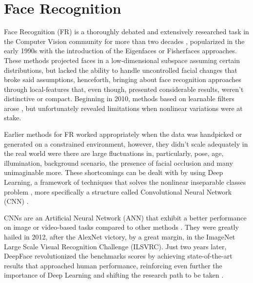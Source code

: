 \documentclass[class=report, crop=false, a4paper, 12pt]{standalone}
\begin{document}
\newpage

\section{Face Recognition}
Face Recognition (FR) is a thoroughly debated and extensively researched task in the Computer Vision community for more than two decades \autocite{ranjanDeepLearningUnderstanding2018}, popularized in the early 1990s with the introduction of the Eigenfaces \autocite{turkEigenfacesRecognition1991} or Fisherfaces \autocite{p.n.belhumeurEigenfacesVsFisherfaces1997} approaches. These methods projected faces in a low-dimensional subspace assuming certain distributions, but lacked the ability to handle uncontrolled facial changes that broke said assumptions, henceforth, bringing about face recognition approaches through local-features \autocite{chengjunliuGaborFeatureBased2002, ahonenFaceDescriptionLocal2006} that, even though, presented considerable results, weren't distinctive or compact. Beginning in 2010, methods based on learnable filters arose \autocite{z.caoFaceRecognitionLearningbased2010,leiLearningDiscriminantFace2014}, but unfortunately revealed limitations when nonlinear variations were at stake.

\par Earlier methods for FR worked appropriately when the data was handpicked or generated on a constrained environment, however, they didn't scale adequately in the real world were there are large fluctuations in, particularly, pose, age, illumination, background scenario, the presence of facial occlusion \autocite{ranjanDeepLearningUnderstanding2018} and many unimaginable more. These shortcomings can be dealt with by using Deep Learning, a framework of techniques that solves the nonlinear inseparable classes problem , more specifically a structure called Convolutional Neural Network (CNN) \autocite{wangDeepFaceRecognition2021}. 

\par CNNs are an Artificial Neural Network (ANN) that exhibit a better performance on image or video-based tasks compared to other methods \autocite{lecunGradientBasedLearningApplied1998}. They were greatly hailed in 2012, after the AlexNet \autocite{krizhevskyImageNetClassificationDeep2012} victory, by a great margin, in the ImageNet Large Scale Visual Recognition Challenge (ILSVRC). Just two years later, DeepFace \autocite{taigmanDeepFaceClosingGap2014} revolutionized the benchmarks scores by achieving state-of-the-art results that approached human performance, reinforcing even further the importance of Deep Learning and shifting the research path to be taken \autocite{wangDeepFaceRecognition2021}.
\end{document}
